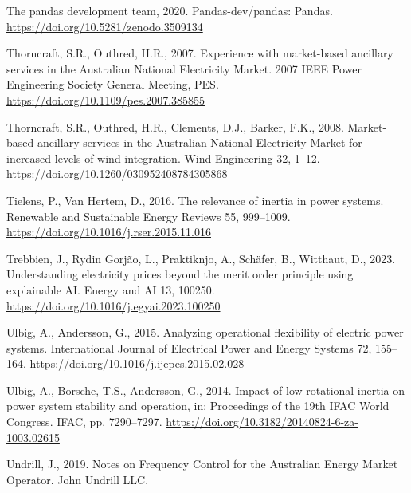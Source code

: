 \documentclass[12pt,a4paper,]{report}
\newlength{\cslhangindent}
\newenvironment{CSLReferences}[2] %
 {%
  \setlength{\parindent}{0pt}
  \ifodd #1 \everypar{\setlength{\hangindent}{\cslhangindent}}\ignorespaces\fi
  \ifnum #2 > 0
  \setlength{\parskip}{#2\baselineskip}
  \fi
 }%
 {}
\begin{document}
\begin{CSLReferences}{1}{0}
\leavevmode{}%
The pandas development team, 2020. Pandas-dev/pandas: {Pandas}.
\url{https://doi.org/10.5281/zenodo.3509134}

\leavevmode{}%
Thorncraft, S.R., Outhred, H.R., 2007. Experience with market-based
ancillary services in the {Australian National Electricity Market}. 2007
IEEE Power Engineering Society General Meeting, PES.
\url{https://doi.org/10.1109/pes.2007.385855}

\leavevmode{}%
Thorncraft, S.R., Outhred, H.R., Clements, D.J., Barker, F.K., 2008.
Market-based ancillary services in the {Australian National Electricity
Market} for increased levels of wind integration. Wind Engineering 32,
1--12. \url{https://doi.org/10.1260/030952408784305868}

\leavevmode{}%
Tielens, P., Van Hertem, D., 2016. The relevance of inertia in power
systems. Renewable and Sustainable Energy Reviews 55, 999--1009.
\url{https://doi.org/10.1016/j.rser.2015.11.016}

\leavevmode{}%
Trebbien, J., Rydin Gorjão, L., Praktiknjo, A., Schäfer, B., Witthaut,
D., 2023. Understanding electricity prices beyond the merit order
principle using explainable {AI}. Energy and AI 13, 100250.
\url{https://doi.org/10.1016/j.egyai.2023.100250}

\leavevmode{}%
Ulbig, A., Andersson, G., 2015. Analyzing operational flexibility of
electric power systems. International Journal of Electrical Power and
Energy Systems 72, 155--164.
\url{https://doi.org/10.1016/j.ijepes.2015.02.028}

\leavevmode{}%
Ulbig, A., Borsche, T.S., Andersson, G., 2014. Impact of low rotational
inertia on power system stability and operation, in: Proceedings of the
19th {IFAC World Congress}. IFAC, pp. 7290--7297.
\url{https://doi.org/10.3182/20140824-6-za-1003.02615}

\leavevmode{}%
Undrill, J., 2019. Notes on {Frequency Control} for the {Australian
Energy Market Operator}. John Undrill LLC.


\end{CSLReferences}
\end{document}
